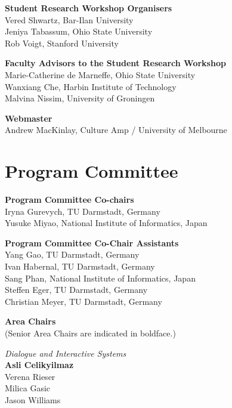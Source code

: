 {\bf Student Research Workshop Organisers} \\
Vered Shwartz, Bar-Ilan University\\
Jeniya Tabassum, Ohio State University\\
Rob Voigt, Stanford University

{\bf Faculty Advisors to the Student Research Workshop} \\
Marie-Catherine de Marneffe, Ohio State University\\
Wanxiang Che, Harbin Institute of Technology\\
Malvina Nissim, University of Groningen

{\bf Webmaster} \\
Andrew MacKinlay, Culture Amp / University of Melbourne


\clearpage
\section{Program Committee}
\setlength{\parindent}{0pt}

{\bf Program Committee Co-chairs} \\
Iryna Gurevych, TU Darmstadt, Germany \\
Yusuke Miyao, National Institute of Informatics, Japan

{\bf Program Committee Co-Chair Assistants} \\
Yang Gao, TU Darmstadt, Germany \\
Ivan Habernal, TU Darmstadt, Germany \\
Sang Phan, National Institute of Informatics, Japan \\
Steffen Eger, TU Darmstadt, Germany \\
Christian Meyer, TU Darmstadt, Germany

{\bf Area Chairs} \\
(Senior Area Chairs are indicated in boldface.)

\emph{Dialogue and Interactive Systems} \\
\hspace*{5mm}\textbf{Asli Celikyilmaz} \\
\hspace*{5mm}Verena Rieser \\
\hspace*{5mm}Milica Gasic \\
\hspace*{5mm}Jason Williams

